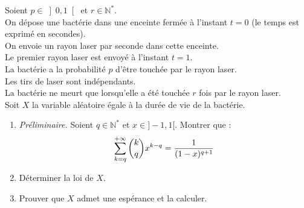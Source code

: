 \documentclass[a4paper,10pt]{report}
\begin{document}
\begin{Exercice}{} Soient $p\in \left] 0,1\right[$ et $r\in\mathbb{N}^*$.\\
On dépose une bactérie dans une enceinte fermée à l'instant $t=0$ (le temps est exprimé en secondes).\\
On envoie un rayon laser par seconde dans cette enceinte.\\
Le premier rayon laser est envoyé à l'instant $t=1$.\\
La bactérie a la probabilité $p$ d'être touchée par le rayon laser.\\
Les tirs de laser sont indépendants.\\
La bactérie ne meurt que lorsqu'elle a été touchée $r$ fois par le rayon laser.\\
Soit $X$ la variable aléatoire égale à la durée de vie de la bactérie.\\
\begin{enumerate}
\item \textit{Préliminaire.} Soient $q \in \mathbb{N}^*$ et $x \in ]-1,1[$. Montrer que : 
$$ \sum\limits_{k=q}^{+\infty}\dbinom{k}{q}x^{k-q}=\dfrac{1}{(1-x)^{q+1}}$$
\item
Déterminer la loi de $X$.
\item
Prouver que $X$ admet une espérance et la calculer.
\end{enumerate}
\end{Exercice}

\corr
\end{document}
